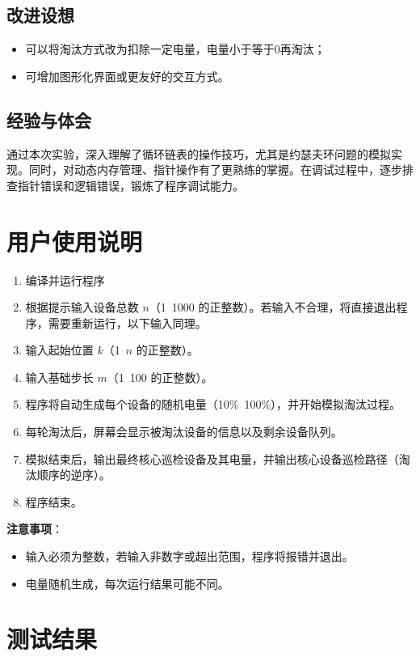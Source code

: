 \documentclass[UTF8]{ctexart}
\begin{document}
\subsection{改进设想}
\begin{itemize}
    \item 可以将淘汰方式改为扣除一定电量，电量小于等于0再淘汰；
    \item 可增加图形化界面或更友好的交互方式。
\end{itemize}

\subsection{经验与体会}
通过本次实验，深入理解了循环链表的操作技巧，尤其是约瑟夫环问题的模拟实现。同时，对动态内存管理、指针操作有了更熟练的掌握。在调试过程中，逐步排查指针错误和逻辑错误，锻炼了程序调试能力。

\section{用户使用说明}

\begin{enumerate}
    \item 编译并运行程序
    \item 根据提示输入设备总数 \( n \)（1~1000 的正整数）。若输入不合理，将直接退出程序，需要重新运行，以下输入同理。
    \item 输入起始位置 \( k \)（1~\( n \) 的正整数）。
    \item 输入基础步长 \( m \)（1~100 的正整数）。
    \item 程序将自动生成每个设备的随机电量（10\%~100\%），并开始模拟淘汰过程。
    \item 每轮淘汰后，屏幕会显示被淘汰设备的信息以及剩余设备队列。
    \item 模拟结束后，输出最终核心巡检设备及其电量，并输出核心设备巡检路径（淘汰顺序的逆序）。
    \item 程序结束。
\end{enumerate}

\textbf{注意事项}：
\begin{itemize}
    \item 输入必须为整数，若输入非数字或超出范围，程序将报错并退出。
    \item 电量随机生成，每次运行结果可能不同。
\end{itemize}

\section{测试结果}
\end{document}
